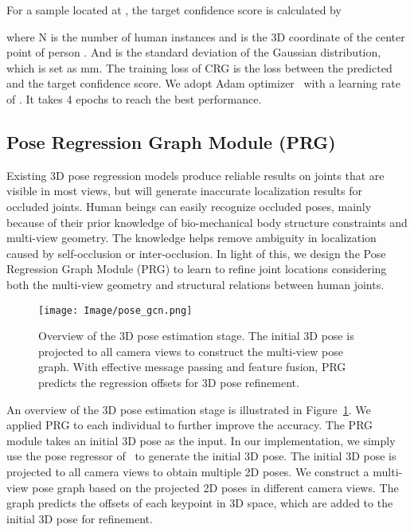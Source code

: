 \documentclass[10pt,twocolumn,letterpaper]{article}
\begin{document}
For a sample located at , the target confidence score is calculated by

where N is the number of human instances and  is the 3D coordinate of the center point of person . And  is the standard deviation of the Gaussian distribution, which is set as mm. The training loss of CRG is the  loss between the predicted and the target confidence score. We adopt Adam optimizer~\cite{kingma2014method} with a learning rate of . It takes 4 epochs to reach the best performance.


\subsection{Pose Regression Graph Module (PRG)}

Existing 3D pose regression models produce reliable results on joints that are visible in most views, but will generate inaccurate localization results for occluded joints. Human beings can easily recognize occluded poses, mainly because of their prior knowledge of bio-mechanical body structure constraints and multi-view geometry. The knowledge helps remove ambiguity in localization caused by self-occlusion or inter-occlusion. In light of this, we design the Pose Regression Graph Module (PRG) to learn to refine joint locations considering both the multi-view geometry and structural relations between human joints. 

\begin{figure}[t]
	\centering
	\texttt{[image: Image/pose\_gcn.png]}
	\caption{Overview of the 3D pose estimation stage. The initial 3D pose is projected to all camera views to construct the multi-view pose graph. With effective message passing and feature fusion, PRG predicts the regression offsets for 3D pose refinement.}
	\label{fig:pose_graph}
\end{figure}

An overview of the 3D pose estimation stage is illustrated in Figure~\ref{fig:pose_graph}. We applied PRG to each individual to further improve the accuracy. The PRG module takes an initial 3D pose as the input. In our implementation, we simply use the pose regressor of~\cite{tu2020voxelpose} to generate the initial 3D pose. The initial 3D pose is projected to all camera views to obtain multiple 2D poses. 
We construct a multi-view pose graph based on the projected 2D poses in different camera views. The graph predicts the offsets of each keypoint in 3D space, which are added to the initial 3D pose for refinement. 
\end{document}
